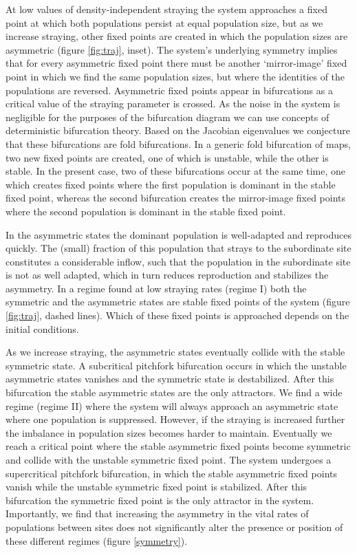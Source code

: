 \documentclass{revtex4}
\begin{document}
\noindent At low values of density-independent straying the system approaches a fixed point at which both populations persist at equal population size, but as we increase straying, other fixed points are created in which the population sizes are asymmetric (figure \ref{fig:traj}, inset).
The system's underlying symmetry implies that for every asymmetric fixed point there must be another `mirror-image' fixed point in which we find the same population sizes, but where the identities of the populations are reversed.
Asymmetric fixed points appear in bifurcations as a critical value of the straying parameter is crossed. 
As the noise in the system is negligible for the purposes of the bifurcation diagram we can use concepts of deterministic bifurcation theory. 
Based on the Jacobian eigenvalues we conjecture that these bifurcations are fold bifurcations. 
In a generic fold bifurcation of maps, two new fixed points are created, one of which is unstable, while the other is stable. 
In the present case, two of these bifurcations occur at the same time, one which creates fixed points where the first population is dominant in the stable fixed point, whereas the second bifurcation creates the mirror-image fixed points where the second population is dominant in the stable fixed point.      

In the asymmetric states the dominant population is well-adapted and reproduces quickly. 
The (small) fraction of this population that strays to the subordinate site constitutes a considerable inflow, such that the population in the subordinate site is not as well adapted, which in turn reduces reproduction and stabilizes the asymmetry. 
In a regime found at low straying rates (regime I) both the symmetric and the asymmetric states are stable fixed points of the system (figure \ref{fig:traj}, dashed lines). 
Which of these fixed points is approached depends on the initial conditions. 

As we increase straying, the asymmetric states eventually collide with the stable symmetric state. 
A subcritical pitchfork bifurcation occurs in which the unstable asymmetric states vanishes and the symmetric state is destabilized. 
After this bifurcation the stable asymmetric states are the only attractors. 
We find a wide regime (regime II) where the system will always approach an asymmetric state where one population is suppressed. 
However, if the straying is increased further the imbalance in population sizes becomes harder to maintain. 
Eventually we reach a critical point where the stable asymmetric fixed points become symmetric and collide with the unstable symmetric fixed point. 
The system undergoes a supercritical pitchfork bifurcation, in which the stable asymmetric fixed points vanish while the unstable symmetric fixed point is stabilized. 
After this bifurcation the symmetric fixed point is the only attractor in the system. 
Importantly, we find that increasing the asymmetry in the vital rates of populations between sites does not significantly alter the presence or position of these different regimes (figure \ref{symmetry}).
\end{document}
